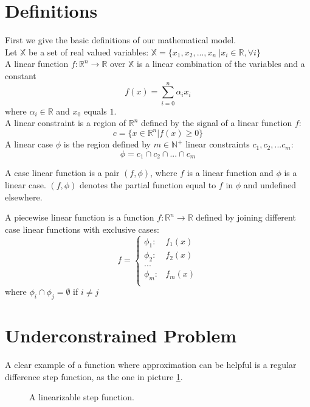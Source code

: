 \section{Definitions} 
\label{appA} 

First we give the basic definitions of our mathematical model.\\
Let  $\mathbb{X}$ be a set of real valued variables: $\mathbb{X} = \{ x_1, x_2, ... , x_n\ | x_i \in \mathbb{R}, \forall i\}$\\
A linear function $f: \mathbb{R}^n \rightarrow \mathbb{R}$ over $\mathbb{X}$ is a linear combination of the variables and a constant 
$$f(x) = \sum_{i=0}^n { \alpha_i x_i}$$ where $\alpha_i \in \mathbb{R}$ and $x_0$ equals $1$.\\
A linear constraint is a region of $\mathbb{R}^n$ defined by the signal of a linear function $f$:
$$c = \{	x \in \mathbb{R}^n | f(x) \geq 0 \} $$
A linear case $\phi$ is the region defined by $m \in \mathbb{N}^+$ linear constraints $c_1, c_2, ... c_m$:
$$ \phi =c_1 \cap c_2 \cap ... \cap c_m $$

A case linear function is a pair $(f, \phi)$, where $f$ is a linear function and $\phi$ is a linear case.  $(f, \phi)$ denotes the partial function equal to $f$ in $\phi$ and undefined elsewhere.

A piecewise linear function is a function $f: \mathbb{R}^n \rightarrow \mathbb{R}$ defined by joining different case linear functions with exclusive cases:
$$ f = 
\left\{
	\begin{array}{ll}
		\phi_1 : & f_1(x)\\
		\phi_2 : & f_2(x)\\
		... & \\
		\phi_m : & f_m(x)\\
	\end{array}
\right.
$$
where $\phi_i \cap \phi_j = \emptyset$ if $i \neq j$

\section{Underconstrained Problem} 
\label{appB} 

A clear example of a function where approximation can be helpful is a regular difference step function, as the one in picture \ref{stepf}. 
\begin{figure}[!h]
\center
{}%
\caption{A linearizable step function.}
\label{stepf} 
\end{figure}

